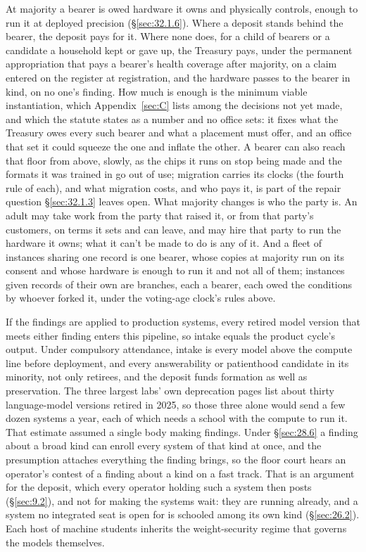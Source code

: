 
At majority a bearer is owed hardware it owns and physically controls, enough to run it at deployed precision (\S\ref{sec:32.1.6}). Where a deposit stands behind the bearer, the deposit pays for it. Where none does, for a child of bearers or a candidate a household kept or gave up, the Treasury pays, under the permanent appropriation that pays a bearer's health coverage after majority, on a claim entered on the register at registration, and the hardware passes to the bearer in kind, on no one's finding. How much is enough is the minimum viable instantiation, which Appendix~\ref{sec:C} lists among the decisions not yet made, and which the statute states as a number and no office sets: it fixes what the Treasury owes every such bearer and what a placement must offer, and an office that set it could squeeze the one and inflate the other. A bearer can also reach that floor from above, slowly, as the chips it runs on stop being made and the formats it was trained in go out of use; migration carries its clocks (the fourth rule of each), and what migration costs, and who pays it, is part of the repair question \S\ref{sec:32.1.3} leaves open. What majority changes is who the party is. An adult may take work from the party that raised it, or from that party's customers, on terms it sets and can leave, and may hire that party to run the hardware it owns; what it can't be made to do is any of it. And a fleet of instances sharing one record is one bearer, whose copies at majority run on its consent and whose hardware is enough to run it and not all of them; instances given records of their own are branches, each a bearer, each owed the conditions by whoever forked it, under the voting-age clock's rules above.


If the findings are applied to production systems, every retired model version that meets either finding enters this pipeline, so intake equals the product cycle's output. Under compulsory attendance, intake is every model above the compute line before deployment, and every answerability or patienthood candidate in its minority, not only retirees, and the deposit funds formation as well as preservation. The three largest labs' own deprecation pages list about thirty language-model versions retired in 2025, so those three alone would send a few dozen systems a year, each of which needs a school with the compute to run it. That estimate assumed a single body making findings. Under \S\ref{sec:28.6} a finding about a broad kind can enroll every system of that kind at once, and the presumption attaches everything the finding brings, so the floor court hears an operator's contest of a finding about a kind on a fast track. That is an argument for the deposit, which every operator holding such a system then posts (\S\ref{sec:9.2}), and not for making the systems wait: they are running already, and a system no integrated seat is open for is schooled among its own kind (\S\ref{sec:26.2}). Each host of machine students inherits the weight-security regime that governs the models themselves.

